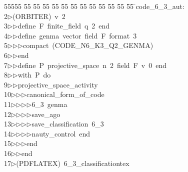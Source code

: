 %
%
\begin{tabbing}
55555 \= 55 \= 55 \= 55 \= 55 \= 55 \= 55 \= 55 \= 55 \= 55 \= 55 \= 55 \= 55 \= \>code\_6\_3\_aut:\\[0pt]
2\>$\triangleright$\>(ORBITER)\ v\ 2\ \\[0pt]
3\>$\triangleright$\>$\triangleright$\>define\ F\ finite\_field\ q\ 2\ end\ \\[0pt]
4\>$\triangleright$\>$\triangleright$\>define\ genma\ vector\ field\ F\ format\ 3\ \\[0pt]
5\>$\triangleright$\>$\triangleright$\>$\triangleright$\>compact\ (CODE\_N6\_K3\_Q2\_GENMA)\ \\[0pt]
6\>$\triangleright$\>$\triangleright$\>end\ \\[0pt]
7\>$\triangleright$\>$\triangleright$\>define\ P\ projective\_space\ n\ 2\ field\ F\ v\ 0\ end\ \\[0pt]
8\>$\triangleright$\>$\triangleright$\>with\ P\ do\ \\[0pt]
9\>$\triangleright$\>$\triangleright$\>projective\_space\_activity\ \\[0pt]
10\>$\triangleright$\>$\triangleright$\>$\triangleright$\>canonical\_form\_of\_code\ \\[0pt]
11\>$\triangleright$\>$\triangleright$\>$\triangleright$\>$\triangleright$\>6\_3\ genma\ \\[0pt]
12\>$\triangleright$\>$\triangleright$\>$\triangleright$\>$\triangleright$\>save\_ago\ \\[0pt]
13\>$\triangleright$\>$\triangleright$\>$\triangleright$\>$\triangleright$\>save\_classification\ 6\_3\ \\[0pt]
14\>$\triangleright$\>$\triangleright$\>$\triangleright$\>$\triangleright$\>nauty\_control\ end\ \\[0pt]
15\>$\triangleright$\>$\triangleright$\>$\triangleright$\>end\ \\[0pt]
16\>$\triangleright$\>$\triangleright$\>end\\[0pt]
17\>$\triangleright$\>(PDFLATEX)\ 6\_3\_classificationtex\\[0pt]

\end{tabbing}
